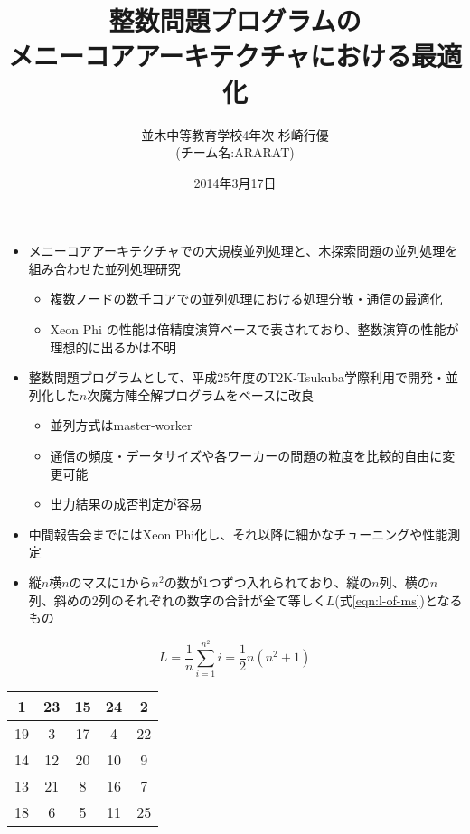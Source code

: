 \documentclass[headrule,footrule,landscape,a4paper,25pt]{foils}
\title{整数問題プログラムの \\ メニーコアアーキテクチャにおける最適化}
\date{2014年3月17日}
\author{並木中等教育学校4年次 杉崎行優 \\ (チーム名:ARARAT)}
\begin{document}
\MyLogo{}
\maketitle

 \begin{itemize}
  \item メニーコアアーキテクチャでの大規模並列処理と、木探索問題の並列処理を組み合わせた並列処理研究
  \begin{itemize}
   \item 複数ノードの数千コアでの並列処理における処理分散・通信の最適化
   \item Xeon Phi の性能は倍精度演算ベースで表されており、整数演算の性能が理想的に出るかは不明
  \end{itemize}
 \end{itemize}

 \begin{itemize}
  \item 整数問題プログラムとして、平成25年度のT2K-Tsukuba学際利用で開発・並列化した$n$次魔方陣全解プログラムをベースに改良
  \begin{itemize}
   \item 並列方式はmaster-worker
   \item 通信の頻度・データサイズや各ワーカーの問題の粒度を比較的自由に変更可能
   \item 出力結果の成否判定が容易
  \end{itemize}
  \item 中間報告会までにはXeon Phi化し、それ以降に細かなチューニングや性能測定
 \end{itemize}

 \begin{itemize}
  \item 縦$n$横$n$のマスに$1$から$n^2$の数が$1$つずつ入れられており、縦の$n$列、横の$n$列、斜めの$2$列のそれぞれの数字の合計が全て等しく$L$(式\ref{eqn:l-of-ms})となるもの
 \end{itemize}
 \begin{equation} \label{eqn:l-of-ms}
  L=\frac{1}{n} \sum_{i=1}^{n^2}i = \frac{1}{2} n(n^2+1)
 \end{equation}

 {\Large
  \begin{center}
   \begin{tabular}{|c|c|c|c|c|}
    \hline
    1 & 23 & 15 & 24 & 2 \\\hline
    19 & 3 & 17 & 4 & 22 \\\hline
    14 & 12 & 20 & 10 & 9 \\\hline
    13 & 21 & 8 & 16 & 7 \\\hline
    18 & 6 & 5 & 11 & 25 \\\hline
   \end{tabular}
  \end{center}
 }
\end{document}
